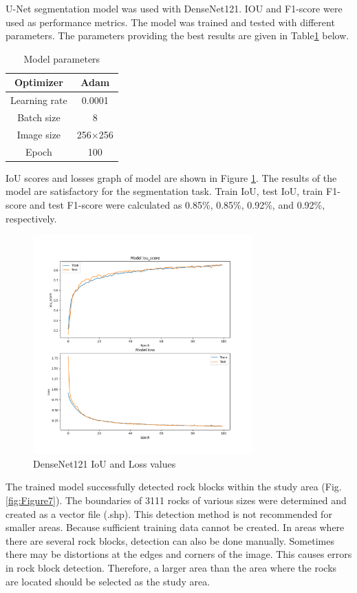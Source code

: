 \documentclass[a4paper,fleqn]{cas-sc}
\begin{document}
U-Net segmentation model was used with DenseNet121. IOU and F1-score were used as performance metrics. The model was trained and tested with different parameters. The parameters providing the best results are given in Table\ref{tab:Table1} below.


\begin{table}
	\centering
	\caption{Model parameters}
	\label{tab:Table1}
	\begin{tabular}{ |c|c|} 
		\hline
		Optimizer&Adam\\ 
		\hline 
		Learning rate&0.0001\\
		\hline
		Batch size&8\\
		\hline
		Image size&256$\times$256\\
		\hline
		Epoch&100\\
		\hline
	\end{tabular} 
\end{table}


IoU scores and losses graph of model are shown in Figure \ref{fig:Figure6}. The results of the model are satisfactory for the segmentation task. Train IoU, test IoU, train F1-score and test F1-score were calculated as 0.85\%, 0.85\%, 0.92\%, and 0.92\%, respectively.

\begin{figure}
	\centering
	\includegraphics[width=0.75\textwidth]{fig6.png}
	\caption{DenseNet121 IoU and Loss values}
	\label{fig:Figure6}
\end{figure}

The trained model successfully detected rock blocks within the study area (Fig. \ref{fig:Figure7}). The boundaries of 3111 rocks of various sizes were determined and created as a vector file (.shp). This detection method is not recommended for smaller areas. Because sufficient training data cannot be created. In areas where there are several rock blocks, detection can also be done manually. 
Sometimes there may be distortions at the edges and corners of the image. This causes errors in rock block detection. Therefore, a larger area than the area where the rocks are located should be selected as the study area.
\end{document}
